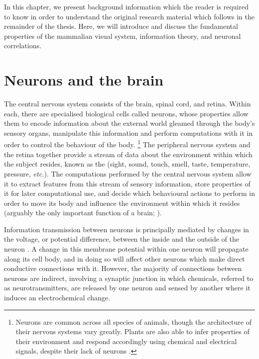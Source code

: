 

In this chapter, we present background information which the reader is required to know in order to understand the original research material which follows in the remainder of the thesis.
Here, we will introduce and discuss the fundamental properties of the mammalian visual system, information theory, and neuronal correlations.


\section{Neurons and the brain}

The central nervous system consists of the brain, spinal cord, and retina.
Within each, there are specialised biological cells called neurons, whose properties allow them to encode information about the external world gleamed through the body's sensory organs, manipulate this information and perform computations with it in order to control the behaviour of the body.%
\footnote{
Neurons are common across all species of animals, though the architecture of their nervous systems vary greatly.
Plants are also able to infer properties of their environment and respond accordingly using chemical and electrical signals, despite their lack of neurons \citep{Brenner2006,Barlow2008}.
}
The peripheral nervous system and the retina together provide a stream of data about the environment within which the subject resides, known as the  (sight, sound, touch, smell, taste, temperature, pressure, \textit{etc.}).
The computations performed by the central nervous system allow it to extract features from this stream of sensory information, store properties of it for later computational use, and decide which behavioural actions to perform in order to move its body and influence the environment within which it resides (arguably the only important function of a brain; \citealp{WolpertTED}).

Information transmission between neurons is principally mediated by changes in the voltage, or potential difference, between the inside and the outside of the neuron \citep[Chapter~2]{nsbook}.
A change in this membrane potential within one neuron will propagate along its cell body, and in doing so will affect other neurons which make direct conductive connections with it.
However, the majority of connections between neurons are indirect, involving a synaptic junction in which chemicals, referred to as neurotransmitters, are released by one neuron and sensed by another where it induces an electrochemical change.

